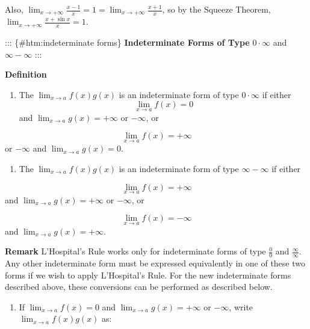 \documentclass[
  letterpaper,
  DIV=11,
  numbers=noendperiod]{scrartcl}
\providecommand{\tightlist}{%
  \setlength{\itemsep}{0pt}\setlength{\parskip}{0pt}}\usepackage{longtable,booktabs,array}
\begin{document}
Also,
\(\displaystyle\lim_{x\to+\infty}{\frac{x-1}{x}=1=\displaystyle\lim_{x\to+\infty}{\frac{x+1}{x}}}\),
so by the Squeeze Theorem,
\(\displaystyle\lim_{x\to+\infty}{\frac{x+\sin x}{x}=1}\).

::: \{\#htm:indeterminate forms\} \textbf{Indeterminate Forms of Type}
\(0\cdot \infty\) and \(\infty -\infty\) :::

\leavevmode{}%
\textbf{Definition}

\begin{enumerate}
\def\labelenumi{\arabic{enumi}.}
\tightlist
\item
  The \(\displaystyle\lim_{x\to a}{f(x)g(x)}\) is an indeterminate form
  of type \(0\cdot \infty\) if either \[
  \displaystyle\lim_{x\to a}{f(x)=0}\] and
  \(\displaystyle\lim_{x\to a}{g(x)=+\infty}\) or \(-\infty\), or
\end{enumerate}

\[
\displaystyle\lim_{x\to a}{f(x)=+\infty}
\] or \(-\infty\) and \(\displaystyle\lim_{x\to a}{g(x)=0}\).

\begin{enumerate}
\def\labelenumi{\arabic{enumi}.}
\setcounter{enumi}{1}
\tightlist
\item
  The \(\displaystyle\lim_{x\to a}{f(x)g(x)}\) is an indeterminate form
  of type \(\infty - \infty\) if either
\end{enumerate}

\[
\displaystyle\lim_{x\to a}{f(x)=+\infty}
\] and \(\displaystyle\lim_{x\to a}{g(x)=+\infty}\) or \(-\infty\), or

\[
\displaystyle\lim_{x\to a}{f(x)=-\infty}
\] and \(\displaystyle\lim_{x\to a}{g(x)=+\infty}\).

\leavevmode{}%
\textbf{Remark} L'Hospital's Rule works only for indeterminate forms of
type \(\frac{0}{0}\) and \(\frac{\infty}{\infty}\). Any other
indeterminate form must be expressed equivalently in one of these two
forms if we wish to apply L'Hospital's Rule. For the new indeterminate
forms described above, these conversions can be performed as described
below.

\begin{enumerate}
\def\labelenumi{\arabic{enumi}.}
\tightlist
\item
  If \(\displaystyle\lim_{x\to a}{f(x)=0}\) and
  \(\displaystyle\lim_{x\to a}{g(x)=+\infty}\) or \(-\infty\), write
  \(\displaystyle\lim_{x\to a}{f(x)g(x)}\) as:
\end{enumerate}
\end{document}
